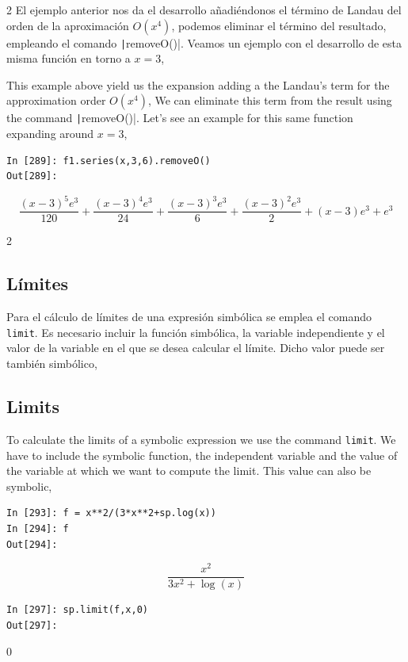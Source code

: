 \begin{paracol}{2}
El ejemplo anterior nos da el desarrollo añadiéndonos el término de Landau del orden de la aproximación $O(x^4)$, podemos eliminar el término del resultado, empleando el comando \texttt|removeO()|. Veamos un ejemplo con el desarrollo de esta misma función en torno a $x=3$,

\switchcolumn
This example above yield us the expansion adding a the Landau's term for the approximation order $O(x^4)$, We can eliminate this term from the result using the command \texttt|removeO()|. Let's see an example for this same function expanding around $x=3$,
\end{paracol}
 
 
\begin{center}
	\begin{minipage}{.7\textwidth}
		\begin{verbatim}
In [289]: f1.series(x,3,6).removeO()
Out[289]: 
		\end{verbatim}
		\begin{equation*}			
			\frac{(x-3)^5e^3}{120}+\frac{(x-3)^4e^3}{24}+\frac{(x-3)^3e^3}{6}+\frac{(x-3)^2e^3}{2}+(x-3)e^3+e^3
		\end{equation*}
	\end{minipage}
\end{center}

\begin{paracol}{2}
\subsection{Límites} 
Para el cálculo de límites de una expresión simbólica se emplea el comando \texttt{limit}. Es necesario incluir la función simbólica, la variable independiente y el valor de la variable en el que se desea calcular el límite.  Dicho valor puede ser también simbólico,
\switchcolumn
\subsection{Limits} 
To calculate the limits of a symbolic expression we use the command \texttt{limit}. We have to include the symbolic function, the independent variable and the value of the variable at which we want to compute the limit. This value can also be symbolic,
\end{paracol}

\begin{center}
	\begin{minipage}{.3\textwidth}
		\begin{verbatim}
In [293]: f = x**2/(3*x**2+sp.log(x))
In [294]: f
Out[294]:	
		\end{verbatim}
\begin{equation*}
\frac{x^2}{3x^2+\log(x)}	
\end{equation*}

\begin{verbatim}
In [297]: sp.limit(f,x,0)
Out[297]: 
		\end{verbatim}
		$0$
	\end{minipage}
\end{center}

